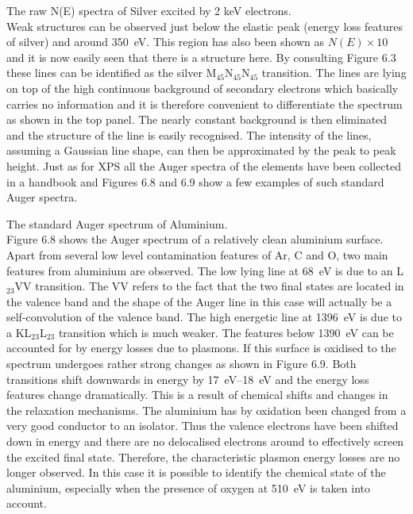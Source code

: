            The raw N(E)  spectra  of  Silver
          excited by 2 keV electrons.\\

Weak structures can be observed just below the elastic peak (energy loss features of silver) and around \SI{350}{\electronvolt}. This region has also been shown as $N(E)\times 10$ and it is now easily seen that there is a structure here. By consulting Figure 6.3 these lines can be identified as the silver M$_{45}$N$_{45}$N$_{45}$ transition. The lines are lying on top of the high continuous background of secondary electrons which basically carries no information and it is therefore convenient to differentiate the spectrum as shown in the top panel. The nearly constant background is then eliminated and the structure of the line is easily recognised. The intensity of the lines, assuming a Gaussian line shape, can then be approximated by the peak to peak height. Just as for XPS all the Auger spectra of the elements have been collected in a handbook \cite{handbook} and Figures 6.8 and 6.9 show a few examples of such standard Auger spectra.
          \newpage

          \vspace*{10.5cm}

                   The standard  Auger  spectrum  of
          Aluminium.\\


Figure 6.8 shows the Auger spectrum of a  relatively clean aluminium surface. Apart from several low level contamination features of Ar, C and O, two main features from aluminium are observed. The low lying line at \SI{68}{\electronvolt} is due to an L$_{23}$VV transition. The VV refers to the fact that the two final states are located in the valence band and the shape of the Auger line in this case will actually be a self-convolution of the valence band. The high energetic line at \SI{1396}{\electronvolt} is due to a KL$_{23}$L$_{23}$ transition which is much weaker. The features below \SI{1390}{\electronvolt} can be accounted for by energy losses due to plasmons. If this surface is oxidised to  the spectrum undergoes rather strong changes as shown in Figure 6.9. Both transitions shift downwards in energy by \SIrange{17}{18}{\electronvolt} and the energy loss features change dramatically. This is a result of chemical shifts and changes in the relaxation mechanisms. The aluminium has by oxidation been changed from a very good conductor to an isolator. Thus the valence electrons have been shifted down in energy and there are no delocalised electrons around to effectively screen the excited final state. Therefore, the characteristic plasmon energy losses are no longer observed. In this case it is possible to identify the chemical state of the aluminium, especially when the presence of oxygen at \SI{510}{\electronvolt} is taken into account. \newpage

